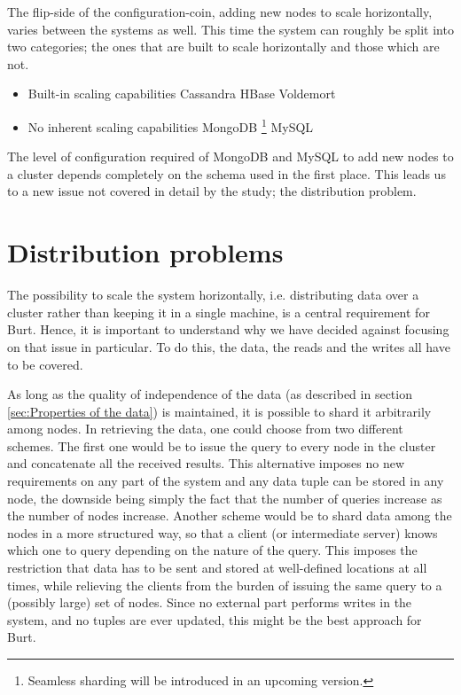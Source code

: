 The flip-side of the configuration-coin, adding new nodes to scale horizontally, varies between the systems as well. This time the system can roughly be split into two categories; the ones that are built to scale horizontally and those which are not.

\begin{itemize}
\item Built-in scaling capabilities
\subitem Cassandra
\subitem HBase
\subitem Voldemort
\item No inherent scaling capabilities
\subitem MongoDB \footnote{Seamless sharding will be introduced in an upcoming version.}
\subitem MySQL
\end{itemize}

The level of configuration required of MongoDB and MySQL to add new nodes to a cluster depends completely on the schema used in the first place. This leads us to a new issue not covered in detail by the study; the distribution problem.

\section{Distribution problems}

The possibility to scale the system horizontally, i.e. distributing data over a cluster rather than keeping it in a single machine, is a central requirement for Burt. Hence, it is important to understand why we have decided against focusing on that issue in particular. To do this, the data, the reads and the writes all have to be covered.

As long as the quality of independence of the data (as described in section \ref{sec:Properties of the data}) is maintained, it is possible to shard it arbitrarily among nodes. In retrieving the data, one could choose from two different schemes. The first one would be to issue the query to every node in the cluster and concatenate all the received results. This alternative imposes no new requirements on any part of the system and any data tuple can be stored in any node, the downside being simply the fact that the number of queries increase as the number of nodes increase. Another scheme would be to shard data among the nodes in a more structured way, so that a client (or intermediate server) knows which one to query depending on the nature of the query. This imposes the restriction that data has to be sent and stored at well-defined locations at all times, while relieving the clients from the burden of issuing the same query to a (possibly large) set of nodes. Since no external part performs writes in the system, and no tuples are ever updated, this might be the best approach for Burt.

